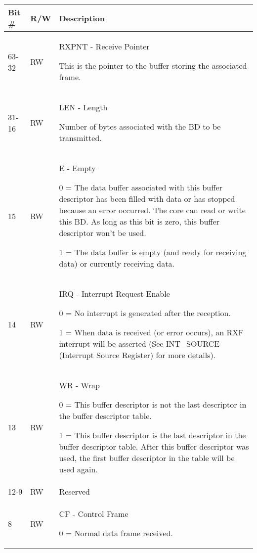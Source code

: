 \begin{table}[H]
  \centering
  \begin{tabularx}{\textwidth}{|l|l|X|}
    
    \hline
    \rowcolor{iob-green}
    {\bf Bit \#} & {\bf R/W} & {\bf Description} \\ \hline

    63-32   & RW  & RXPNT - Receive Pointer

                This is the pointer to the buffer storing the associated
                frame.\\ \hline
    \rowcolor{iob-blue}
    31-16   & RW & LEN - Length

                 Number of bytes associated with the BD to be transmitted.\\
                 \hline
    15      & RW & E - Empty

                0 = The data buffer associated with this buffer descriptor has
                been filled with data or has stopped because an error occurred.
                The core can read or write this BD. As long as this bit is
                zero, this buffer descriptor won’t be used.

                1 = The data buffer is empty (and ready for receiving data) or
                currently receiving data.\\ \hline
    \rowcolor{iob-blue}
    14      & RW & IRQ - Interrupt Request Enable

                0 = No interrupt is generated after the reception.

                1 = When data is received (or error occurs), an RXF interrupt
                will be asserted (See INT\_SOURCE (Interrupt Source Register)
                for more details).\\ \hline
    13      & RW & WR - Wrap

                0 = This buffer descriptor is not the last descriptor in the
                buffer descriptor table.

                1 = This buffer descriptor is the last descriptor in the buffer
                descriptor table. After this buffer descriptor was used, the
                first buffer descriptor in the table will be used again. \\
                \hline
    \rowcolor{iob-blue}
    12-9    & RW & Reserved \\ \hline
    8       & RW & CF - Control Frame

                0 = Normal data frame received.


\end{tabularx}
\end{table}

